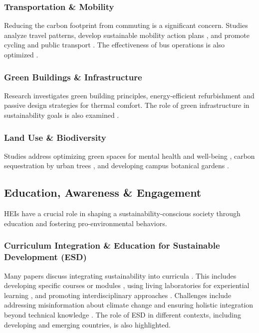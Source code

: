 \documentclass[12pt,a4paper]{article}
\begin{document}
\subsubsection{Transportation \& Mobility}

Reducing the carbon footprint from commuting is a significant concern. Studies analyze travel patterns, develop sustainable mobility action plans \citep{Ibrahim2022}, and promote cycling and public transport \citep{MateoBabiano2020, Ibrahim2022, Saini2023}. The effectiveness of bus operations is also optimized \citep{Johar2025}.

\subsubsection{Green Buildings \& Infrastructure}

Research investigates green building principles, energy-efficient refurbishment and passive design strategies for thermal comfort. The role of green infrastructure in sustainability goals is also examined \citep{Tao2019, Pini2019, Kanchana2025}.

\subsubsection{Land Use \& Biodiversity}

Studies address optimizing green spaces for mental health and well-being \citep{Mustari2025}, carbon sequestration by urban trees \citep{Yasin2024, Lee2025}, and developing campus botanical gardens \citep{Hapsari2025, Mustari2025}.

\subsection{Education, Awareness \& Engagement}

HEIs have a crucial role in shaping a sustainability-conscious society through education and fostering pro-environmental behaviors.

\subsubsection{Curriculum Integration \& Education for Sustainable Development (ESD)}

Many papers discuss integrating sustainability into curricula \citep{Mendez2025, Zhu2025, Builes2024, Orhan2021}. This includes developing specific courses or modules \citep{Nagatomo2023}, using living laboratories for experiential learning \citep{Gomez2021}, and promoting interdisciplinary approaches \citep{Nagatomo2023}. Challenges include addressing misinformation about climate change \citep{Hess2018} and ensuring holistic integration beyond technical knowledge \citep{Gamage2022}. The role of ESD in different contexts, including developing and emerging countries, is also highlighted.
\end{document}
